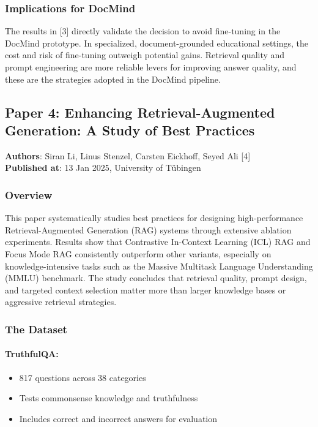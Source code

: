 \documentclass[12pt, a4paper, oneside]{report}
\let\oldsubsection\subsection
\renewcommand{\subsection}{%
  \addtocontents{toc}{\protect\needspace{3\baselineskip}}%
  \oldsubsection
}
\begin{document}
\subsubsection{Implications for DocMind}

The results in [3] directly validate the decision to avoid fine-tuning in the DocMind prototype. In specialized, document-grounded educational settings, the cost and risk of fine-tuning outweigh potential gains. Retrieval quality and prompt engineering are more reliable levers for improving answer quality, and these are the strategies adopted in the DocMind pipeline.

\newpage
\subsection{Paper 4: Enhancing Retrieval-Augmented Generation: A Study of Best Practices}

\textbf{Authors}: Siran Li, Linus Stenzel, Carsten Eickhoff, Seyed Ali [4]\\
\textbf{Published at}: 13 Jan 2025, University of T\"{u}bingen

\subsubsection{Overview}

This paper systematically studies best practices for designing high-performance Retrieval-Augmented Generation (RAG) systems through extensive ablation experiments. Results show that Contrastive In-Context Learning (ICL) RAG and Focus Mode RAG consistently outperform other variants, especially on knowledge-intensive tasks such as the Massive Multitask Language Understanding (MMLU) benchmark. The study concludes that retrieval quality, prompt design, and targeted context selection matter more than larger knowledge bases or aggressive retrieval strategies.

\subsubsection{The Dataset}

\paragraph{TruthfulQA:}
\begin{itemize}[noitemsep]
  \item 817 questions across 38 categories
  \item Tests commonsense knowledge and truthfulness
  \item Includes correct and incorrect answers for evaluation
\end{itemize}
\end{document}
